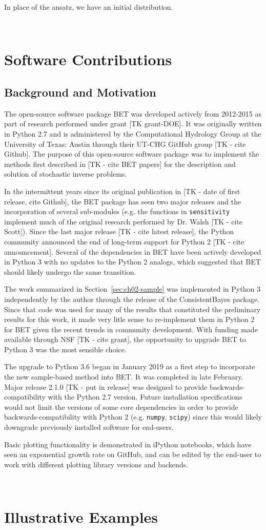 In place of the ansatz, we have an initial distribution.


\
\section{Software Contributions}

\subsection{Background and Motivation}
The open-source software package BET was developed actively from 2012-2015 as part of research performed under grant [TK grant-DOE].
It was originally written in Python 2.7 and is administered by the Computational Hydrology Group at the University of Texas: Austin through their UT-CHG GitHub group [TK - cite Github]. 
The purpose of this open-source software package was to implement the methods first described in [TK - cite BET papers] for the description and solution of stochastic inverse problems. 

In the intermittent years since its original publication in [TK - date of first release, cite Github], the BET package has seen two major releases and the incorporation of several sub-modules (e.g. the functions in {\tt sensitivity} implement much of the original research performed by Dr. Walsh [TK - cite Scott]). 
Since the last major release [TK - cite latest release], the Python community announced the end of long-term support for Python 2 [TK - cite announcement]. 
Several of the dependencies in BET have been actively developed in Python 3 with no updates to the Python 2 analogs, which suggested that BET should likely undergo the same transition.

The work summarized in Section~\ref{sec:ch02-sample} was implemented in Python 3 independently by the author through the release of the ConsistentBayes package.
Since that code was used for many of the results that constituted the preliminary results for this work, it made very litle sense to re-implement them in Python 2 for BET given the recent trends in community development. 
With funding made available through NSF [TK - cite grant], the opportunity to upgrade BET to Python 3 was the most sensible choice. 

The upgrade to Python 3.6 began in January 2019 as a first step to incorporate the new sample-based method into BET. 
It was completed in late February. 
Major release 2.1.0 [TK - put in release] was designed to provide backwards-compatibility with the Python 2.7 version. 
Future installation specifications would not limit the versions of some core dependencies in order to provide backwards-compatibility with Python 2 (e.g. {\tt numpy}, {\tt scipy}) since this would likely downgrade previously installed software for end-users. 

Basic plotting functionality is demonstrated in iPython notebooks, which have seen an exponential growth rate on GitHub, and can be edited by the end-user to work with different plotting library versions and backends.




\
\section{Illustrative Examples}


